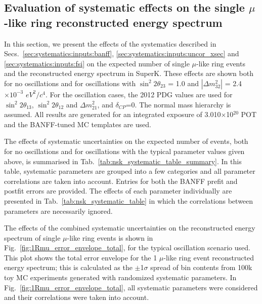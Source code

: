 
\subsection {Evaluation of systematic effects on the single $\mu$-like ring reconstructed energy spectrum}
\label{sec:systematics:evaluation}

In this section, we present the effects of the systematics described in Secs.\ \ref{sec:systematics:inputs:banff}, 
\ref{sec:systematics:inputs:uncor_xsec} and \ref{sec:systematics:inputs:fsi} on the expected 
number of single $\mu$-like ring events and the reconstructed energy spectrum in SuperK.
These effects are shown both for no oscillations and for oscillations with
$\sin^{2}2\theta_{23}$ = 1.0 and $|\Delta m^{2}_{32}|$ = 2.4$\times10^{-3}$ $eV^{2}/c^{4}$.
For the oscillation cases, the 2012 PDG values are used for $\sin^{2}2\theta_{13}$, $\sin^{2}2\theta_{12}$ and $\Delta m^{2}_{21}$,
and $\delta_{CP}$=0. The normal mass hierarchy is assumed.
All results are generated for an integrated exposure of 3.010$\times$10$^{20}$ POT and
the BANFF-tuned MC templates are used.

The effects of systematic uncertainties on the expected number of events, both for no oscillations and for oscillations 
with the typical parameter values given above, is summarised in Tab.\ \ref{tab:nsk_systematic_table_summary}.
In this table, systematic parameters are grouped into a few categories and all parameter correlations are taken into account.
Entries for both the BANFF prefit and postfit errors are provided.
The effects of each parameter individually are presented in Tab.\ \ref{tab:nsk_systematic_table} in which the correlations 
between parameters are necessarily ignored.

The effects of the combined systematic uncertainties on the reconstructed energy spectrum of single $\mu$-like ring events
is shown in Fig.\ \ref{fig:1Rmu_error_envelope_total}, for the typical oscillation scenario used.
This plot shows the total error envelope for the 1 $\mu$-like ring event reconstructed energy spectrum; this is calculated 
as the $\pm$1$\sigma$ spread of bin contents from 100k toy MC experiments generated with randomized systematic parameters.
In Fig.\ \ref{fig:1Rmu_error_envelope_total}, all systematic parameters were considered and their correlations were taken 
into account.

